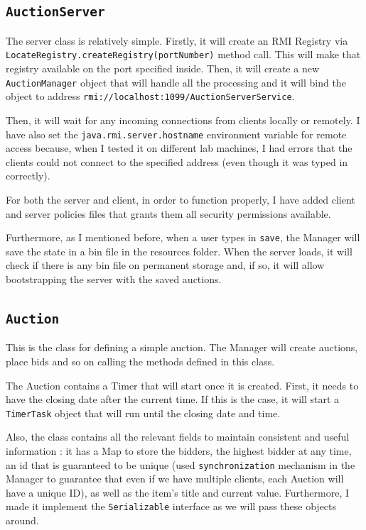 \documentclass[11pt]{article}
\begin{document}
 \subsection{\texttt{AuctionServer}}
 The server class is relatively simple. Firstly, it will create an RMI Registry via \\ \texttt{LocateRegistry.createRegistry(portNumber)} method call. This will make that registry available on the port specified inside. Then, it will create a new \texttt{AuctionManager} object that will handle all the processing and it will bind the object to address \texttt{rmi://localhost:1099/AuctionServerService}.
 
 Then, it will wait for any incoming connections from clients locally or remotely. I have also set the \texttt{java.rmi.server.hostname} environment variable for remote access because, when I tested it on different lab machines, I had errors that the clients could not connect to the specified address (even though it was typed in correctly).
 
 For both the server and client, in order to function properly, I have added client and server policies files that grants them all security permissions available. 
 
 Furthermore, as I mentioned before, when a user types in \texttt{save}, the Manager will save the state in a bin file in the resources folder. When the server loads, it will check if there is any bin file on permanent storage and, if so, it will allow bootstrapping the server with the saved auctions.
 
 \subsection{\texttt{Auction}}
 This is the class for defining a simple auction. The Manager will create auctions, place bids and so on calling the methods defined in this class. 
 
 The Auction contains a Timer that will start once it is created. First, it needs to have the closing date after the current time. If this is the case, it will start a \texttt{TimerTask} object that will run until the closing date and time. 
 
 Also, the class contains all the relevant fields to maintain consistent and useful information : it has a Map to store the bidders, the highest bidder at any time, an id that is guaranteed to be unique (used \texttt{synchronization} mechanism in the Manager to guarantee that even if we have multiple clients, each Auction will have a unique ID), as well as the item's title and current value. Furthermore, I made it implement the \texttt{Serializable} interface as we will pass these objects around.
\end{document}
